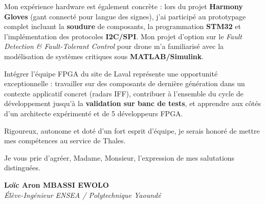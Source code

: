 \documentclass[a4paper,11pt]{article}
\begin{document}
Mon expérience hardware est également concrète : lors du projet \textbf{Harmony Gloves} (gant connecté pour langue des signes), j'ai participé au prototypage complet incluant la \textbf{soudure} de composants, la programmation \textbf{STM32} et l'implémentation des protocoles \textbf{I2C/SPI}. Mon projet d'option sur le \textit{Fault Detection \& Fault-Tolerant Control} pour drone m'a familiarisé avec la modélisation de systèmes critiques sous \textbf{MATLAB/Simulink}.

Intégrer l'équipe FPGA du site de Laval représente une opportunité exceptionnelle : travailler sur des composants de dernière génération dans un contexte applicatif concret (radars IFF), contribuer à l'ensemble du cycle de développement jusqu'à la \textbf{validation sur banc de tests}, et apprendre aux côtés d'un architecte expérimenté et de 5 développeurs FPGA.

Rigoureux, autonome et doté d'un fort esprit d'équipe, je serais honoré de mettre mes compétences au service de Thales.

Je vous prie d'agréer, Madame, Monsieur, l'expression de mes salutations distinguées.

\vspace{0.8cm}

\textbf{Loïc Aron MBASSI EWOLO}\\
\textit{Élève-Ingénieur ENSEA / Polytechnique Yaoundé}
\end{document}
